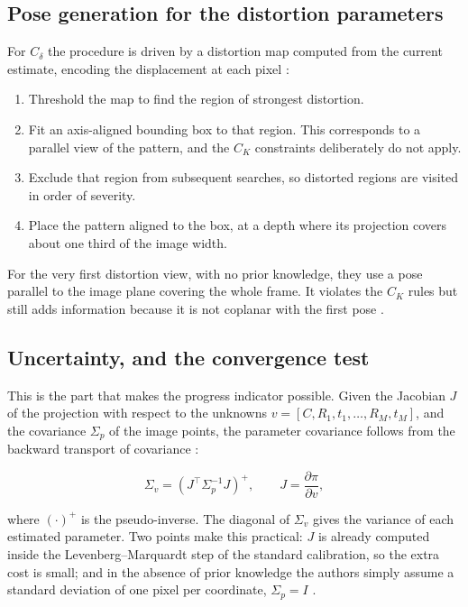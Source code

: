 \subsection{Pose generation for the distortion parameters}

For $C_\delta$ the procedure is driven by a distortion map computed from the current estimate, encoding the displacement at each pixel \cite{rojtberg2018pose}:

\begin{enumerate}
    \item Threshold the map to find the region of strongest distortion.
    \item Fit an axis-aligned bounding box to that region. This corresponds to a parallel view of the pattern, and the $C_K$ constraints deliberately do not apply.
    \item Exclude that region from subsequent searches, so distorted regions are visited in order of severity.
    \item Place the pattern aligned to the box, at a depth where its projection covers about one third of the image width.
\end{enumerate}

For the very first distortion view, with no prior knowledge, they use a pose parallel to the image plane covering the whole frame. It violates the $C_K$ rules but still adds information because it is not coplanar with the first pose \cite{rojtberg2018pose}.

\subsection{Uncertainty, and the convergence test}

This is the part that makes the progress indicator possible. Given the Jacobian $J$ of the projection with respect to the unknowns $v = [C, R_1, t_1, \ldots, R_M, t_M]$, and the covariance $\Sigma_p$ of the image points, the parameter covariance follows from the backward transport of covariance \cite{rojtberg2018pose}:

\begin{equation}
\Sigma_v = \left( J^{\top} \Sigma_p^{-1} J \right)^{+} , \qquad J = \frac{\partial \pi}{\partial v} ,
\label{eq:covariance}
\end{equation}

where $(\cdot)^{+}$ is the pseudo-inverse. The diagonal of $\Sigma_v$ gives the variance of each estimated parameter. Two points make this practical: $J$ is already computed inside the Levenberg--Marquardt step of the standard calibration, so the extra cost is small; and in the absence of prior knowledge the authors simply assume a standard deviation of one pixel per coordinate, $\Sigma_p = I$ \cite{rojtberg2018pose}.

